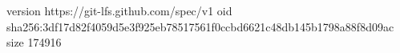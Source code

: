 version https://git-lfs.github.com/spec/v1
oid sha256:3df17d82f4059d5e3f925eb78517561f0ccbd6621c48db145b1798a88f8d09ac
size 174916
